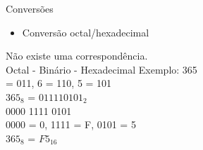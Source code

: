 

\begin{frame}{Conversões}
    \begin{itemize}
        \item Conversão octal/hexadecimal
    \end{itemize}
    Não existe uma correspondência. \\[0.2cm]
    Octal - Binário - Hexadecimal
    \vspace{0.2cm}
    Exemplo: 365 \\[0.2cm]
     = 011, 6 = 110, 5 = 101 \\[0.2cm]
    $365_{8}$ = $011110101_{2}$ \\[0.2cm]
    0000 1111 0101 \\[0.2cm]
    0000 = 0, 1111 = F, 0101 = 5 \\[0.2cm]
    $365_{8}$ = $F5_{16}$
\end{frame}